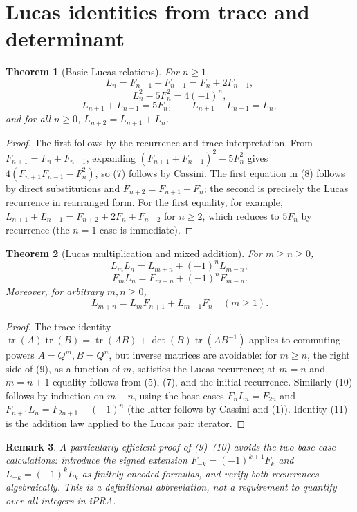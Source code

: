 \documentclass[11pt]{article}
\newtheorem{theorem}{Theorem}[section]
\newtheorem{remark}[theorem]{Remark}
\begin{document}
\section{Lucas identities from trace and determinant}
\begin{theorem}[Basic Lucas relations]
For $n\ge1$,
\[L_n=F_{n-1}+F_{n+1}=F_n+2F_{n-1},\tag{6}\]
\[L_n^2-5F_n^2=4(-1)^n,\tag{7}\]
\[L_{n+1}+L_{n-1}=5F_n,\qquad L_{n+1}-L_{n-1}=L_n,\tag{8}\]
and for all $n\ge0$, $L_{n+2}=L_{n+1}+L_n$.
\end{theorem}
\begin{proof}
The first follows by the recurrence and trace interpretation. From $F_{n+1}=F_n+F_{n-1}$, expanding $(F_{n+1}+F_{n-1})^2-5F_n^2$ gives $4(F_{n+1}F_{n-1}-F_n^2)$, so (7) follows by Cassini. The first equation in (8) follows by direct substitutions and $F_{n+2}=F_{n+1}+F_n$; the second is precisely the Lucas recurrence in rearranged form. For the first equality, for example, $L_{n+1}+L_{n-1}=F_{n+2}+2F_n+F_{n-2}$ for $n\ge2$, which reduces to $5F_n$ by recurrence (the $n=1$ case is immediate). 
\end{proof}
\begin{theorem}[Lucas multiplication and mixed addition]
For $m\ge n\ge0$,
\[ L_mL_n=L_{m+n}+(-1)^n L_{m-n},\tag{9}\]
\[ F_mL_n=F_{m+n}+(-1)^n F_{m-n}.\tag{10}\]
Moreover, for arbitrary $m,n\ge0$,
\[L_{m+n}=L_mF_{n+1}+L_{m-1}F_n\quad(m\ge1).\tag{11}\]
\end{theorem}
\begin{proof}
The trace identity $\operatorname{tr}(A)\operatorname{tr}(B)=\operatorname{tr}(AB)+\det(B)\operatorname{tr}(AB^{-1})$ applies to commuting powers $A=Q^m,B=Q^n$, but inverse matrices are avoidable: for $m\ge n$, the right side of (9), as a function of $m$, satisfies the Lucas recurrence; at $m=n$ and $m=n+1$ equality follows from (5), (7), and the initial recurrence. Similarly (10) follows by induction on $m-n$, using the base cases $F_nL_n=F_{2n}$ and $F_{n+1}L_n=F_{2n+1}+(-1)^n$ (the latter follows by Cassini and (1)). Identity (11) is the addition law applied to the Lucas pair iterator.
\end{proof}
\begin{remark}A particularly efficient proof of (9)--(10) avoids the two base-case calculations: introduce the signed extension $F_{-k}=(-1)^{k+1}F_k$ and $L_{-k}=(-1)^kL_k$ as finitely encoded formulas, and verify both recurrences algebraically. This is a definitional abbreviation, not a requirement to quantify over all integers in iPRA.\end{remark}
\end{document}
